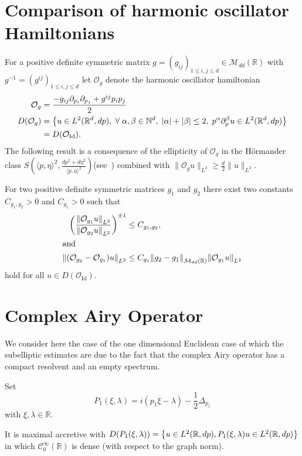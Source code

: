 \documentclass[10pt]{amsart}
\theoremstyle{definition}\newtheorem{defi}[theo]{Definition}\newtheorem{rema}[theo]{Remark}\newtheorem{exam}[theo]{Example}\newtheorem{exem}[theo]{Example}\newtheorem{nota}[theo]{Notation}
\newcommand{\R}{\mathbb{R}}
\newcommand{\N}{\mathbb{N}}
\newcommand{\clC}{\mathcal{C}}
\newcommand{\clO}{\mathcal{O}}
\newcommand{\clM}{\mathcal{M}}
\DeclareMathOperator{\Idd}{Id}
\newcommand\norm[1]{\left\lVert#1\right\rVert}
\let\oldforall\forall
\renewcommand*{\forall}{\mathrel{\oldforall}}
\let\originalleft\left
\let\originalright\right
\renewcommand{\left}{\mathopen{}\mathclose\bgroup\originalleft}
\renewcommand{\right}{\aftergroup\egroup\originalright}
\begin{document}
\appendix
\section{Comparison of harmonic oscillator Hamiltonians} For a positive definite symmetric matrix $g=(g_{ij})_{1\leq i,j\leq d}\in \clM_{dd}(\R)$ with $g^{-1}=(g^{ij})_{1\leq i,j\leq d}$ let $\clO_{g}$ denote the harmonic oscillator hamiltonian
\begin{align*}
\clO_{g}&=\frac{-g_{ij}\partial_{p_i}\partial_{p_j}+g^{ij}p_ip_j}{2}\\
D(\clO_{g})&=\left\{u\in L^2(\R^d,dp),\; \forall\alpha,\beta\in\N^d, \;|\alpha|+|\beta|\leq 2,\; p^{\alpha}\partial_{p}^{\beta}u\in L^2(\R^d,dp)\right\}\\
&=D(\clO_{\Idd}).
\end{align*}
The following result is a consequence of the ellipticity of $\clO_{g}$ in the H\"ormander class $S(\langle p,\eta\rangle^2,
\frac{dp^2+d\eta^2}{\langle p,\eta\rangle^2})$(see~\cite[Chapter~XVIII]{HormIII}) combined with $\|\clO_g u\|_{L^2}\geq \frac{d}{2}\|u\|_{L^2}$.

\begin{prop}\label{pr:composcharm}
For two positive definite symmetric matrices $g_1$ and $g_2$ there exist two constants $C_{g_1,g_2}>0$ and $C_{g_1}>0$ such that
\begin{align*}
 \left(\frac{\norm{\clO_{g_1}u}_{L^2}}{\norm{\clO_{g_2}u}_{L^2}}\right)^{\pm 1}&\leq C_{g_1,g_2},\\
\intertext{and}
\norm{(\clO_{g_2}-\clO_{g_1})u}_{L^2}
&\leq C_{g_1}\norm{g_2-g_1}_{\clM_{dd}(\R)}\norm{\clO_{g_1}u}_{L^2}
\end{align*}
hold for all $u\in D(\clO_{\Idd})$.
\end{prop}

\section{Complex Airy Operator}
\label{sec:euconedim}

We consider here the case of the one dimensional Euclidean case of which the subelliptic estimates are due to the fact that the complex Airy operator has a compact resolvent and an empty spectrum.

Set
\[
P_{1}(\xi,\lambda)=i(p_{1}\xi-\lambda)-\frac{1}{2}\Delta_{p_{1}}
\]
with $\xi,\lambda\in \R$.

It is maximal accretive with $D(P_{1}(\xi,\lambda))=\left\{u\in L^{2}(\R,dp), P_{1}(\xi,\lambda)u\in L^{2}(\R,dp)\right\}$ in which $\clC^{\infty}_{0}(\R)$ is dense (with respect to the graph norm).
\end{document}
